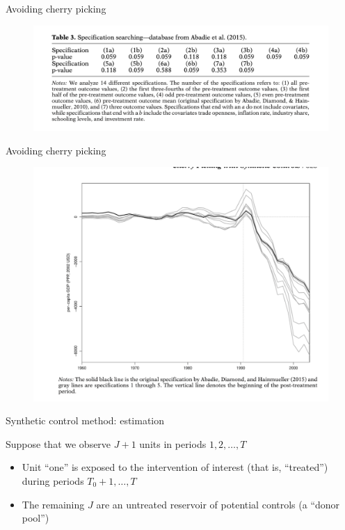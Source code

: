 \documentclass{beamer}
\begin{document}
\begin{frame}{Avoiding cherry picking}

	\begin{figure}
	\includegraphics[scale=0.5]{./lecture_includes/cherry_picking_1.png}
	\end{figure}

\end{frame}

\begin{frame}{Avoiding cherry picking}

	\begin{figure}
	\includegraphics[scale=0.5]{./lecture_includes/cherry_picking_2.png}
	\end{figure}

\end{frame}


\begin{frame}{Synthetic control method: estimation}
	
Suppose that we observe $J+1$ units in periods $1, 2, \dots, T$
		\begin{itemize}
		\item Unit ``one'' is exposed to the intervention of interest (that is, ``treated'') during periods $T_0+1, \dots, T$
		\item The remaining $J$ are an untreated reservoir of potential controls (a ``donor pool'')
		\end{itemize}	
\end{frame}
\end{document}
